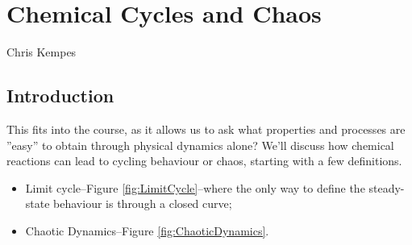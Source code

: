 \documentclass[]{article}
\begin{document}
{\cite[19.S, Nucleic Acids (Summary)]{brown2009chemistry} 
\cite{xu2020selective,bhowmik2019role}
\section{Chemical Cycles and Chaos}

Chris Kempes

\subsection{Introduction}

This fits into the course, as it allows us to ask what properties and processes are ''easy'' to obtain through physical dynamics alone? We'll discuss how chemical reactions can lead to cycling behaviour or chaos, starting with a few definitions.
\begin{itemize}
	\item Limit cycle--Figure \ref{fig:LimitCycle}--where the only way to define the steady-state behaviour is through a closed curve;
	\item Chaotic Dynamics--Figure \ref{fig:ChaoticDynamics}.
\end{itemize}

}
\end{document}
